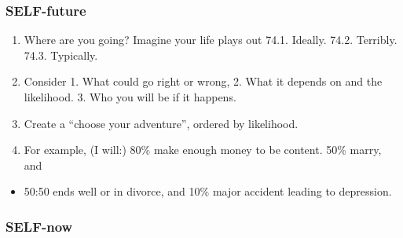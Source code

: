 \documentclass[
]{book}
\providecommand{\tightlist}{%
  \setlength{\itemsep}{0pt}\setlength{\parskip}{0pt}}
\begin{document}
\hypertarget{self-future}{%
\subsubsection{SELF-future}\label{self-future}}

\begin{enumerate}
\def\labelenumi{\arabic{enumi}.}
\setcounter{enumi}{73}
\tightlist
\item
  Where are you going? Imagine your life plays out
  74.1. Ideally.
  74.2. Terribly.
  74.3. Typically.
\item
  Consider 1. What could go right or wrong, 2. What it depends on and the
  likelihood. 3. Who you will be if it happens.
\item
  Create a ``choose your adventure'', ordered by likelihood.
\item
  For example, (I will:) 80\% make enough money to be content. 50\% marry, and
\end{enumerate}

\begin{itemize}
\tightlist
\item
  50:50 ends well or in divorce, and 10\% major accident leading to depression.
\end{itemize}

\hypertarget{self-now}{%
\subsubsection{SELF-now}\label{self-now}}
\end{document}
